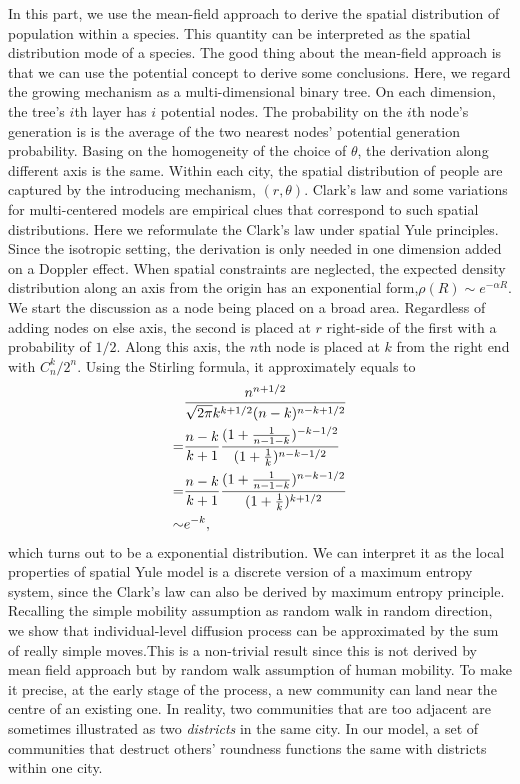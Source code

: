 \documentclass[aps,prl]{revtex4-2}
\begin{document}
In this part, we use the mean-field approach to derive the spatial distribution of population within a species. This quantity can be interpreted as the spatial distribution mode of a species. The good thing about the mean-field approach is that we can use the potential concept to derive some conclusions. Here, we regard the growing mechanism as a multi-dimensional binary tree. On each dimension, the tree's $i$th layer has $i$ potential nodes. The probability on the $i$th node's generation is is the average of the two nearest nodes' potential generation probability. Basing on the homogeneity of the choice of $\theta$, the derivation along different axis is the same. Within each city, the spatial distribution of people are captured by the introducing mechanism, $(r,\theta)$. Clark's law\cite{clark1951urban} and some variations for multi-centered models\cite{griffith1981modelling} are empirical clues that correspond to such spatial distributions. Here we reformulate the Clark's law under spatial Yule principles. Since the isotropic setting, the derivation is only needed in one dimension added on a Doppler effect. When spatial constraints are neglected, the expected density distribution along an axis from the origin has an exponential form,$\rho (R)\sim e^{-\alpha R}$. We start the discussion as a node being placed on a broad area. Regardless of adding nodes on else axis, the second is placed at $r$ right-side of the first with a probability of $1/2$. Along this axis, the $n$th node is placed at $k$ from the right end with $C_n^k/2^n$. Using the Stirling formula, it approximately equals to \begin{align}
    & \frac{n^{n+1/2}}{\sqrt{2\pi}k^{k+1/2}(n-k)^{n-k+1/2}}\notag                         \\
=    & \frac{n-k}{k+1}\frac{(1+\frac{1}{n-1-k})^{-k-1/2}}{(1+\frac{1}{k})^{n-k-1/2}}\notag \\
=    & \frac{n-k}{k+1}\frac{(1+\frac{1}{n-1-k})^{n-k-1/2}}{(1+\frac{1}{k})^{k+1/2}}\notag  \\
\sim & e^{-k},
\end{align}
which turns out to be a exponential distribution. We can interpret it as the local properties of spatial Yule model is a discrete version of a maximum entropy system, since the Clark's law can also be derived by maximum entropy principle\cite{merity2009accurate}. Recalling the simple mobility assumption as random walk in random direction, we show that individual-level diffusion process can be approximated by the sum of really simple moves.This is a non-trivial result since this is not derived by mean field approach but by random walk assumption of human mobility. To make it precise, at the early stage of the process, a new community can land near the centre of an existing one. In reality, two communities that are too adjacent are sometimes illustrated as two \emph{districts} in the same city. In our model, a set of communities that destruct others' roundness functions the same with districts within one city. 
\end{document}
